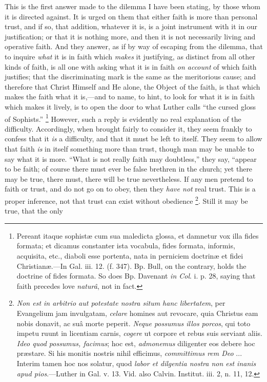 This is the first answer made to the dilemma I have been
stating, by those whom it is directed against. It is urged on them
that either faith is more than personal trust, and if so, that
addition, whatever it is, is a joint instrument with it in our
justification; or that it is nothing more, and then it is not
necessarily living and operative faith. And they answer, as if by way
of escaping from the dilemma, that to inquire \emph{what} it is in
faith which \emph{makes} it justifying, as distinct from all other kinds of
faith, is all one with asking what it is in faith \emph{on account} of
which faith justifies; that the discriminating mark is the same as the
meritorious cause; and therefore that Christ Himself and He alone, the
Object of the faith, is that which makes the faith what it is,—and
to name, to hint, to look for what it is in faith which makes it
lively, is to open the door to what Luther calls ``the cursed
gloss of Sophists.'' \footnote{Pereant itaque
sophistæ cum sua maledicta glossa, et damnetur vox illa fides formata;
et dicamus constanter ista vocabula, fides formata, informis,
acquisita, etc., diaboli esse portenta, nata in perniciem doctrinæ et
fidei Christianæ.—In Gal. iii. 12. (f. 347). Bp. Bull, on the
contrary, holds the doctrine of fides formata. So does Bp. Davenant \emph{in
Col}. i. p. 28, saying that faith precedes love \emph{naturâ}, not
in fact.} However, such a reply is evidently
no real explanation of the difficulty. Accordingly, when brought
fairly to consider it, they seem frankly to confess that it \emph{is}
a difficulty, and that it must be left to itself. They seem to allow
that faith \emph{is} in itself something more than trust, though man
may be unable to say what it is more. ``What is not really faith
may doubtless,'' they say, ``appear to be faith; of course
there must ever be false brethren in the church; yet there may be
true, there must, there will be true nevertheless. If any men pretend to faith or trust, and do not go on to obey, then they \emph{have
not} real trust. This is a proper inference, not that trust can
exist without obedience \footnote{\emph{Non est in
arbitrio aut potestate nostra situm hanc libertatem}, per
Evangelium jam invulgatam, \emph{celare} homines aut revocare, quia
Christus eam nobis donavit, ac suâ morte peperit. \emph{Neque possumus
illos porcos}, qui toto impetu ruunt in licentiam carnis, \emph{cogere}
ut corpore et rebus suis serviant aliis. \emph{Ideo quod possumus,
facimus}; hoc est, \emph{admonemus} diligenter eos debere hoc
præstare. Si his monitis nostris nihil efficimus, \emph{committimus rem
Deo} ... Interim tamen hoc nos solatur, quod \emph{labor et dilgentia
nostra non est inanis apud pios}.—Luther in Gal. v. 13. Vid. also
Calvin. Institut. iii. 2, n. 11, 12.}. Still it may be true, that the only
